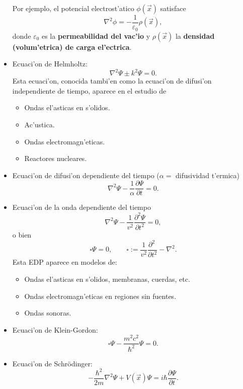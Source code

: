 \begin{itemize}
Por ejemplo, el potencial electrost'atico $\phi(\vec{x})$ satisface
\begin{equation}
\nabla^2\phi=-\frac{1}{\varepsilon_0}\rho(\vec{x}),
\end{equation}
donde $\varepsilon_0$ es la \textbf{permeabilidad del vac'io} y $\rho(\vec{x})$ la \textbf{densidad (volum'etrica) de carga el'ectrica}.
\item Ecuaci'on de Helmholtz: 
\begin{equation}
\nabla^2\Psi\pm k^2\Psi=0.
\end{equation}
Esta ecuaci'on, conocida tambi'en como la ecuaci'on de difusi'on independiente de tiempo, aparece en el estudio de
	\begin{itemize}
	\item Ondas el'asticas en s'olidos.
	\item Ac'ustica.
	\item Ondas electromagn'eticas.
	\item Reactores nucleares.
	\end{itemize}
\item Ecuaci'on de difusi'on dependiente del tiempo ($\alpha= $ difusividad t'ermica)
\begin{equation}\label{eccalor}
\nabla^2\Psi-\frac{1}{\alpha}\frac{\partial \Psi}{\partial t}=0 .
\end{equation}
\item Ecuaci'on de la onda dependiente del tiempo
\begin{equation}
\nabla^2\Psi-\frac{1}{v^2}\frac{\partial^2\Psi}{\partial t^2} =0,
\end{equation}
o bien 
\begin{equation}
\square\Psi=0, \qquad \square:=\frac{1}{v^2}\frac{\partial^2\ }{\partial t^2}-\nabla^2.
\end{equation}
Esta EDP aparece en modelos de:
\begin{itemize}
\item Ondas el'asticas en s'olidos, membranas, cuerdas, etc.
\item Ondas electromagn'eticas en regiones sin fuentes.
\item Ondas sonoras.
\end{itemize}

\item Ecuaci'on de Klein-Gordon:
\begin{equation}
\square\Psi-\frac{m^2c^2}{\hbar^2}\Psi=0.
\end{equation}

\item Ecuaci'on de Schr\"odinger:
\begin{equation}
-\frac{\hbar^2}{2m}\nabla^2\Psi+V(\vec{x})\Psi=i\hbar\frac{\partial\Psi}{\partial t}.
\end{equation}
\end{itemize}

